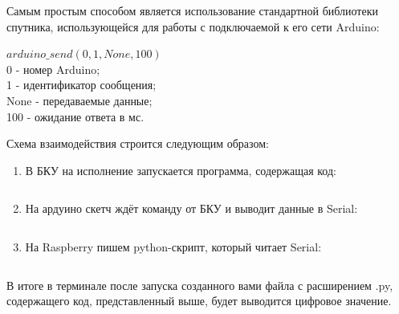 Самым простым способом является использование стандартной библиотеки спутника, использующейся для работы с подключаемой к его сети Arduino:

$arduino\_send(0, 1, None, 100)$\\
0 - номер Arduino;\\
1 - идентификатор сообщения;\\
None - передаваемые данные;\\
100 - ожидание ответа в мс.

Схема взаимодействия строится следующим образом:

\begin{enumerate}
    \item В БКУ на исполнение запускается программа, содержащая код:
    \inputminted[fontsize=\footnotesize, linenos]{python}{final/command_tour/dzz/task_02/source_5.py}
    \item На ардуино скетч ждёт команду от БКУ и выводит данные в Serial:
    \inputminted[fontsize=\footnotesize, linenos]{cpp}{final/command_tour/dzz/task_02/source_6.cpp}
    \item На Raspberry пишем python-скрипт, который читает Serial:
    \inputminted[fontsize=\footnotesize, linenos]{python}{final/command_tour/dzz/task_02/source_7.py}
\end{enumerate}

В итоге в терминале после запуска созданного вами файла с расширением .py, содержащего код, представленный выше, будет выводится цифровое значение.